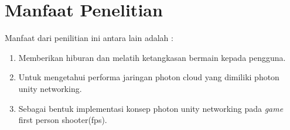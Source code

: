 \section{Manfaat Penelitian}
Manfaat dari penilitian ini antara lain adalah : 
\begin{enumerate}
	\item Memberikan hiburan dan melatih ketangkasan bermain 
	kepada pengguna.
	\item Untuk mengetahui performa jaringan photon cloud yang dimiliki photon unity networking.
	\item Sebagai bentuk implementasi konsep photon unity networking pada \textit{\textit{game}} first person shooter(fps).
\end{enumerate}